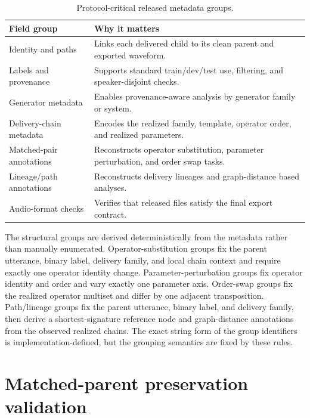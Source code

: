 \begin{table}[t]
\caption{Protocol-critical released metadata groups.}
\label{tab:appendix_manifest_schema}
\centering
\small
\setlength{\tabcolsep}{5pt}
\renewcommand{\arraystretch}{1.08}
\begin{tabular}{@{}p{}p{}@{}}
\toprule
\textbf{Field group} & \textbf{Why it matters} \\
\midrule
Identity and paths & Links each delivered child to its clean parent and exported waveform. \\
Labels and provenance & Supports standard train/dev/test use, filtering, and speaker-disjoint checks. \\
Generator metadata & Enables provenance-aware analysis by generator family or system. \\
Delivery-chain metadata & Encodes the realized family, template, operator order, and realized parameters. \\
Matched-pair annotations & Reconstructs operator substitution, parameter perturbation, and order swap tasks. \\
Lineage/path annotations & Reconstructs delivery lineages and graph-distance based analyses. \\
Audio-format checks & Verifies that released files satisfy the final export contract. \\
\bottomrule
\end{tabular}
\end{table}

The structural groups are derived deterministically from the metadata rather than manually enumerated. Operator-substitution groups fix the parent utterance, binary label, delivery family, and local chain context and require exactly one operator identity change. Parameter-perturbation groups fix operator identity and order and vary exactly one parameter axis. Order-swap groups fix the realized operator multiset and differ by one adjacent transposition. Path/lineage groups fix the parent utterance, binary label, and delivery family, then derive a shortest-signature reference node and graph-distance annotations from the observed realized chains. The exact string form of the group identifiers is implementation-defined, but the grouping semantics are fixed by these rules.


\section{Matched-parent preservation validation}
\label{app:parent_child_drift}

